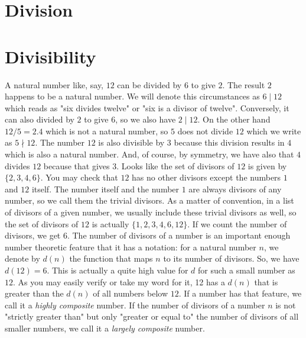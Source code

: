 \section{Division} 

\section{Divisibility}
A natural number like, say, $12$ can be divided by $6$ to give $2$. The result $2$ happens to be a natural number. We will denote this circumstances as $6 \mid 12$ which reads as "six divides twelve" or "six is a divisor of twelve". Conversely, it can also divided by $2$ to give $6$, so we also have $2 \mid 12$. On the other hand $12 / 5 = 2.4$ which is not a natural number, so $5$ does not divide $12$ which we write as $5 \nmid 12$. The number $12$ is also divisible by $3$ because this division results in $4$ which is also a natural number. And, of course, by symmetry, we have also that $4$ divides $12$ because that gives $3$. Looks like the set of divisors of $12$ is given by $\{2,3,4,6\}$. You may check that $12$ has no other divisors except the numbers $1$ and $12$ itself. The number itself and the number $1$ are always divisors of any number, so we call them the trivial divisors. As a matter of convention, in a list of divisors of a given number, we usually include these trivial divisors as well, so the set of divisors of $12$ is actually $\{1,2,3,4,6,12\}$. If we count the number of divisors, we get $6$. The number of divisors of a number is an important enough number theoretic feature that it has a notation: for a natural number $n$, we denote by $d(n)$ the function that maps $n$ to its number of divisors. So, we have $d(12) = 6$. This is actually a quite high value for $d$ for such a small number as $12$. As you may easily verify or take my word for it, 12 has a $d(n)$ that is greater than the $d(n)$ of all numbers below $12$. If a number has that feature, we call it a \emph{highly composite} number. If the number of divisors of a number $n$ is not "strictly greater than" but only "greater or equal to" the number of divisors of all smaller numbers, we call it a \emph{largely composite} number.




